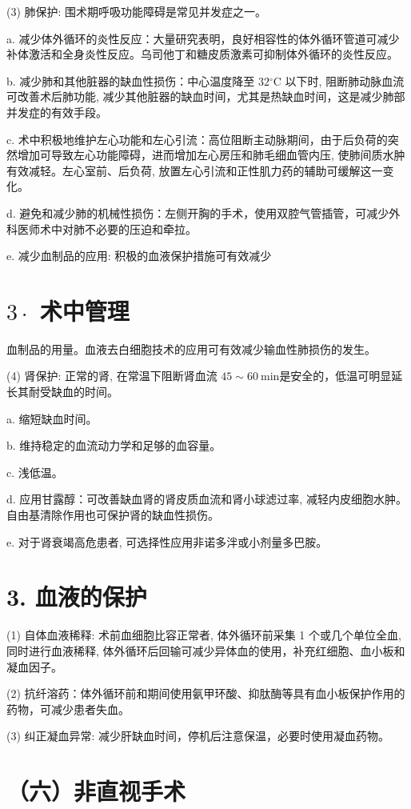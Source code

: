 \documentclass[10pt]{article}
\begin{document}
(3) 肺保护: 围术期呼吸功能障碍是常见并发症之一。

a. 减少体外循环的炎性反应：大量研究表明，良好相容性的体外循环管道可减少补体激活和全身炎性反应。乌司他丁和糖皮质激素可抑制体外循环的炎性反应。

b. 减少肺和其他脏器的缺血性损伤：中心温度降至 $32{ }^{\circ} \mathrm{C}$ 以下时, 阻断肺动脉血流可改善术后肺功能, 减少其他脏器的缺血时间，尤其是热缺血时间，这是减少肺部并发症的有效手段。

c. 术中积极地维护左心功能和左心引流：高位阻断主动脉期间，由于后负荷的突然增加可导致左心功能障碍，进而增加左心房压和肺毛细血管内压, 使肺间质水肿有效减轻。左心室前、后负荷, 放置左心引流和正性肌力药的辅助可缓解这一变化。

d. 避免和减少肺的机械性损伤：左侧开胸的手术，使用双腔气管插管，可减少外科医师术中对肺不必要的压迫和牵拉。

e. 减少血制品的应用: 积极的血液保护措施可有效减少

\section*{$3 \cdot$ 术中管理}
血制品的用量。血液去白细胞技术的应用可有效减少输血性肺损伤的发生。

(4) 肾保护: 正常的肾, 在常温下阻断肾血流 $45 \sim 60 \mathrm{~min}$是安全的，低温可明显延长其耐受缺血的时间。

a. 缩短缺血时间。

b. 维持稳定的血流动力学和足够的血容量。

c. 浅低温。

d. 应用甘露醇：可改善缺血肾的肾皮质血流和肾小球滤过率, 减轻内皮细胞水肿。自由基清除作用也可保护肾的缺血性损伤。

e. 对于肾衰竭高危患者, 可选择性应用非诺多泮或小剂量多巴胺。

\section*{3. 血液的保护}
(1) 自体血液稀释: 术前血细胞比容正常者, 体外循环前采集 1 个或几个单位全血, 同时进行血液稀释, 体外循环后回输可减少异体血的使用，补充红细胞、血小板和凝血因子。

(2) 抗纤溶药：体外循环前和期间使用氨甲环酸、抑肽酶等具有血小板保护作用的药物，可减少患者失血。

(3) 纠正凝血异常: 减少肝缺血时间，停机后注意保温，必要时使用凝血药物。

\section*{（六）非直视手术}
\end{document}
